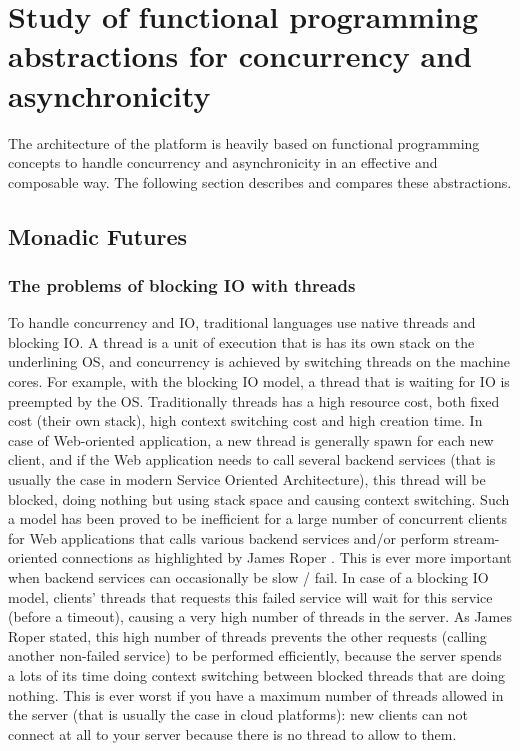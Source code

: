 \chapter{Study of functional programming abstractions for concurrency and asynchronicity}

The architecture of the platform is heavily based on functional programming concepts to handle concurrency and
asynchronicity in an effective and composable way. The following section describes and compares these abstractions.


\section{Monadic Futures}

\subsection{The problems of blocking IO with threads}

To handle concurrency and IO, traditional languages use native threads and blocking IO. A thread is a unit of execution that is has its own stack
on the underlining OS, and concurrency is achieved by switching threads on the machine cores. For example, with the blocking IO model,
a thread that is waiting for IO is preempted by the OS. Traditionally threads has a high resource cost, both fixed cost (their own stack), 
high context switching cost and high creation time. In case of Web-oriented application, a new thread is generally spawn for each new client,
and if the Web application needs to call several backend services (that is usually the case in modern Service Oriented Architecture), 
this thread will be blocked, doing nothing but using stack space and causing context switching.
Such a model has been proved to be inefficient for a large number of concurrent clients for Web applications that calls various backend services
and/or perform stream-oriented connections as highlighted by James Roper . This is ever more
important when backend services can occasionally be slow / fail. In case of a blocking IO model, clients' threads that requests
this failed service will wait for this service (before a timeout), causing a very high number of threads in the server. As James Roper
stated, this high number of threads prevents the other requests (calling another non-failed service) to be performed efficiently,
because the server spends a lots of its time doing context switching between blocked threads that are doing nothing. This is ever worst if
you have a maximum number of threads allowed in the server (that is usually the case in cloud platforms): new clients can not connect at all
to your server because there is no thread to allow to them.

